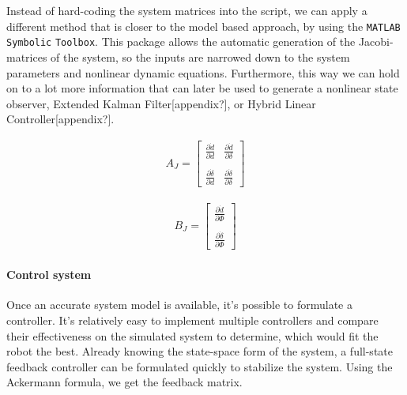 Instead of hard-coding the system matrices into the script, we can apply a different method that is closer to the model based approach, by using the \verb!MATLAB! \verb!Symbolic! \verb!Toolbox!. This package allows the automatic generation of the Jacobi-matrices of the system, so the inputs are narrowed down to the system parameters and nonlinear dynamic equations.
Furthermore, this way we can hold on to a lot more information that can later be used to generate a nonlinear state observer, Extended Kalman Filter[appendix?], or Hybrid Linear Controller[appendix?].
     
\begin{minipage}{0.45\linewidth}
    \begin{align}
        A_J =
        \begin{bmatrix}
           \frac{\partial \dot{d}}{\partial d} & \frac{\partial \dot{d}}{\partial \delta} \\
           & \\
           \frac{\partial \dot{\delta}}{\partial d} & \frac{\partial \dot{\delta}}{\partial \delta}
         \end{bmatrix}
     \end{align}
\end{minipage}
\begin{minipage}{0.45\linewidth}
    \begin{align}
        B_J =
         \begin{bmatrix}
               \frac{\partial \dot{d}}{\partial \Phi} \\
               \\
               \frac{\partial \dot{\delta}}{\partial \Phi}
        \end{bmatrix}
     \end{align}
\end{minipage}

\paragraph{Control system}

Once an accurate system model is available, it's possible to formulate a controller. It's relatively easy to implement multiple controllers and compare their effectiveness on the simulated system to determine, which would fit the robot the best.
Already knowing the state-space form of the system, a full-state feedback controller can be formulated quickly to stabilize the system. Using the Ackermann formula, we get the feedback matrix.

